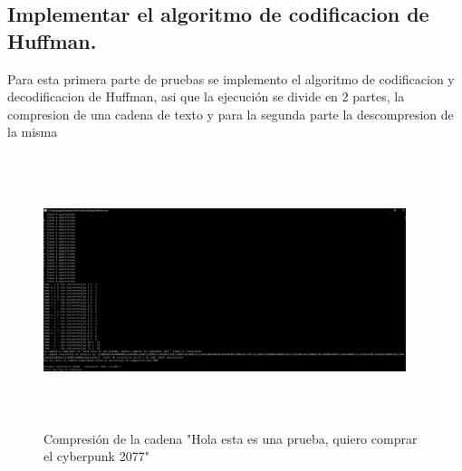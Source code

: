 \documentclass[spanish]{article}
\begin{document}
	\subsection{Implementar el algoritmo de codificacion de Huffman.}
	Para esta primera parte de pruebas se implemento el algoritmo de codificacion y decodificacion de Huffman, asi que la ejecución se divide en 2 partes, la compresion de una cadena de texto y para la segunda parte la descompresion de la misma
	\begin{figure}[H]
		\centering
		\includegraphics[width=400px,height=300px]{captura1}
		\caption{Compresión de la cadena "Hola esta es una prueba, quiero comprar el cyberpunk 2077"}
	\end{figure}
	
\end{document}
